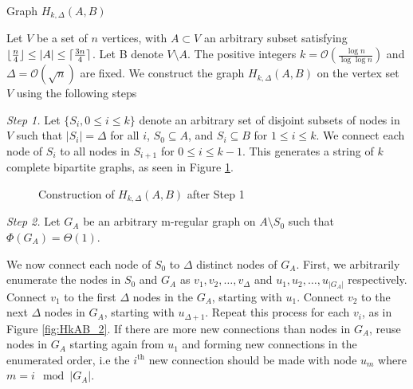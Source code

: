 \begin{definition}\label{def:HkAB}
 	Graph $H_{k, \Delta}(A,B)$

	Let $V$ be a set of $n$ vertices, with $A \subset V$ an arbitrary subset satisfying $\lfloor\frac{n}{4}\rfloor \leq |A| \leq \lceil\frac{3n}{4}\rceil$. %
	Let B denote $V \setminus A$. The positive integers $k = \mathcal{O}\left(\frac{\log n}{\log \log n}\right)$ and $\Delta = \mathcal{O}(\sqrt{n})$ are fixed. We construct the graph $H_{k, \Delta}(A,B)$ on the vertex set $V$ using the following steps


	\textit{Step 1.} Let $\{S_i, 0 \leq i \leq k\}$ denote an arbitrary set of disjoint subsets of nodes in $V$ such that $|S_i| = \Delta$ for all $i$, $S_0 \subseteq A$, and $S_i \subseteq B$ for $1 \leq i \leq k$. We connect each node of $S_i$ to all nodes in $S_{i+1}$ for $0 \leq i \leq k - 1$. This generates a string of $k$ complete bipartite graphs, as seen in Figure \ref{fig:HkAB_1}.

    \begin{figure}[h]
        \centering
        
        \caption{Construction of $H_{k, \Delta}(A,B)$ after Step 1}
        \label{fig:HkAB_1}
    \end{figure}
    
	\textit{Step 2.} Let $G_A$ be an arbitrary m-regular %
	graph on $A \setminus S_0$ such that $\Phi(G_A) = \Theta(1)$. %


	We now connect each node of $S_0$ to $\Delta$ distinct nodes of $G_A$. First, we arbitrarily enumerate the nodes in $S_0$ and $G_A$ as $v_1, v_2, \dots, v_\Delta$ and $u_1, u_2, \dots, u_{|G_A|}$ respectively. Connect $v_1$ to the first $\Delta$ nodes in the $G_A$, starting with $u_1$. Connect $v_2$ to the next $\Delta$ nodes in $G_A$, starting with $u_{\Delta + 1}$.
	Repeat this process for each $v_i$, as in Figure \ref{fig:HkAB_2}.
	If there are more new connections than nodes in $G_A$, reuse nodes in $G_A$ starting again from $u_1$ and forming new connections in the enumerated order, i.e the $i^\text{th}$ new connection should be made with node $u_m$ where $m = i\mod |G_A|$.


\end{definition}
